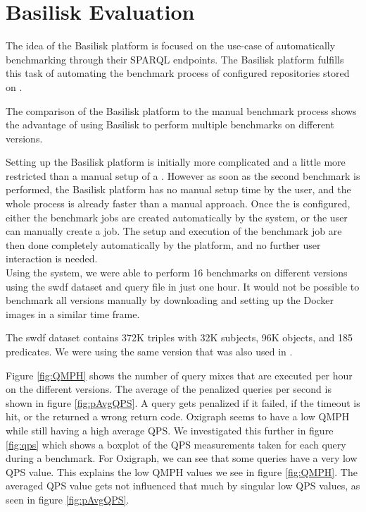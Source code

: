 \section{Basilisk Evaluation}
The idea of the Basilisk platform is focused on the use-case of automatically benchmarking \tsp{} through their SPARQL endpoints.
The Basilisk platform fulfills this task of automating the benchmark process of configured \ts{} repositories stored on \dockh{}.

The comparison of the Basilisk platform to the manual benchmark process shows the advantage of using Basilisk to perform multiple benchmarks on different \ts{} versions.

Setting up the Basilisk platform is initially more complicated and a little more restricted than a manual setup of a \ts{}.
However as soon as the second benchmark is performed, the Basilisk platform has no manual setup time by the user, and the whole process is already faster than a manual approach.
Once the \ts{} is configured, either the benchmark jobs are created automatically by the system, or the user can manually create a job.
The setup and execution of the benchmark job are then done completely automatically by the platform, and no further user interaction is needed.
\\

Using the system, we were able to perform 16 benchmarks on different \tentris{} versions using the \ac{swdf} dataset and query file in just one hour.
It would not be possible to benchmark all versions manually by downloading and setting up the Docker images in a similar time frame.

The \ac{swdf} dataset contains 372K triples with 32K subjects, 96K objects, and 185 predicates.
We were using the same version that was also used in \cite{bigerlTentrisTensorBasedTriple2020}.

Figure \ref{fig:QMPH} shows the number of query mixes that are executed per hour on the different \ts{} versions.
The average of the penalized queries per second is shown in figure \ref{fig:pAvgQPS}.
A query gets penalized if it failed, \eg{} if the timeout is hit, or the \ts{} returned a wrong return code.
Oxigraph seems to have a low QMPH while still having a high average QPS.
We investigated this further in figure \ref{fig:qps} which shows a boxplot of the QPS measurements taken for each query during a benchmark.
For Oxigraph, we can see that some queries have a very low QPS value.
This explains the low QMPH values we see in figure \ref{fig:QMPH}.
The averaged QPS value gets not influenced that much by singular low QPS values, as seen in figure \ref{fig:pAvgQPS}.

